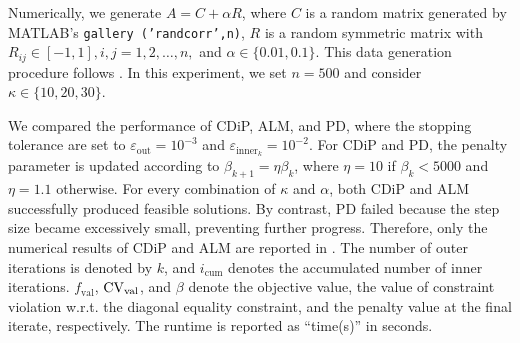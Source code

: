 \documentclass[11pt,a4paper,reqno]{amsart}
\begin{document}
{Numerically, we generate $A=C+\alpha R$, where $C$ is a random matrix generated by MATLAB's \texttt{gallery
(’randcorr’,n)}, $R$ is a random symmetric matrix with
$ R_{ij} \in [-1, 1], i,j = 1, 2, \ldots, n,$ and $\alpha \in \{0.01,0.1\}$.
This data generation procedure follows \cite[Example~5.5]{qi2006quadratically}. In this experiment, we set $n=500$ and consider $\kappa \in \{10,20,30\}$.%

We compared the performance of CDiP, ALM, and PD, where the stopping tolerance are set to $\varepsilon_{\text{out}}=10^{-3}$ and $\varepsilon_{\text{inner}_k}=10^{-2}$. For CDiP and PD, the penalty parameter is updated according to $\beta_{k+1}=\eta \beta_k$, where $\eta=10$ if $\beta_k <5000$ and $\eta=1.1$ otherwise. For every combination of $\kappa$ and $\alpha$, both CDiP and ALM successfully produced feasible solutions. By contrast, PD failed because the step size became excessively small, preventing further progress. Therefore, only the numerical results of CDiP and ALM are reported in . The number of outer iterations is denoted by $k$, and $i_{\text{cum}}$ denotes the accumulated number of inner iterations. $f_\text{val}$, $\rm CV_{\text{val}}$, and $\beta$ denote the objective value, the value of constraint violation w.r.t. the diagonal equality constraint, and the penalty value at the final iterate, respectively. The runtime is reported as ``time(s)” in seconds.

}
\end{document}
